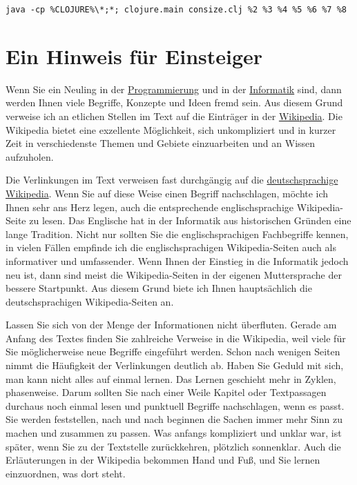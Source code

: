 \begin{verbatim}
java -cp %CLOJURE%\*;*; clojure.main consize.clj %2 %3 %4 %5 %6 %7 %8
\end{verbatim}

\section{Ein Hinweis für Einsteiger}

Wenn Sie ein Neuling in der \href{http://de.wikipedia.org/wiki/Programmierung}{Programmierung} und in der \href{http://de.wikipedia.org/wiki/Informatik}{Informatik} sind, dann werden Ihnen viele Begriffe, Konzepte und Ideen fremd sein. Aus diesem Grund verweise ich an etlichen Stellen im Text auf die Einträger in der \href{http://de.wikipedia.org/wiki/Wikipedia}{Wikipedia}. 
Die Wikipedia bietet eine exzellente Möglichkeit, sich unkompliziert und in kurzer Zeit in verschiedenste Themen und Gebiete einzuarbeiten und an Wissen aufzuholen.

Die Verlinkungen im Text verweisen fast durchgängig auf die \href{http://de.wikipedia.org}{deutschsprachige Wikipedia}. Wenn Sie auf diese Weise einen Begriff nachschlagen, möchte ich Ihnen sehr ans Herz legen, auch die entsprechende englischsprachige Wikipedia-Seite zu lesen. Das Englische hat in der Informatik aus historischen Gründen eine lange Tradition. Nicht nur sollten Sie die englischsprachigen Fachbegriffe kennen, in vielen Fällen empfinde ich die englischsprachigen Wikipedia-Seiten auch als informativer und umfassender. Wenn Ihnen der Einstieg in die Informatik jedoch neu ist, dann sind meist die Wikipedia-Seiten in der eigenen Muttersprache der bessere Startpunkt. Aus diesem Grund biete ich Ihnen hauptsächlich die deutschsprachigen Wikipedia-Seiten an.

Lassen Sie sich von der Menge der Informationen nicht überfluten. Gerade am Anfang des Textes finden Sie zahlreiche Verweise in die Wikipedia, weil viele für Sie möglicherweise neue Begriffe eingeführt werden. Schon nach wenigen Seiten nimmt die Häufigkeit der Verlinkungen deutlich ab. Haben Sie Geduld mit sich, man kann nicht alles auf einmal lernen. Das Lernen geschieht mehr in Zyklen, phasenweise. Darum sollten Sie nach einer Weile Kapitel oder Textpassagen durchaus noch einmal lesen und punktuell Begriffe nachschlagen, wenn es passt. Sie werden feststellen, nach und nach beginnen die Sachen immer mehr Sinn zu machen und zusammen zu passen. Was anfangs kompliziert und unklar war, ist später, wenn Sie zu der Textstelle zurückkehren, plötzlich sonnenklar. Auch die Erläuterungen in der Wikipedia bekommen Hand und Fuß, und Sie lernen einzuordnen, was dort steht.